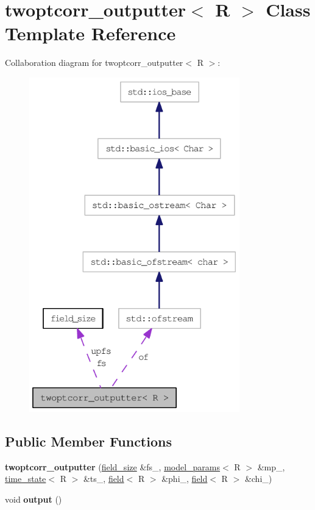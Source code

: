\hypertarget{classtwoptcorr__outputter}{
\section{twoptcorr\_\-outputter$<$ R $>$ Class Template Reference}
\label{classtwoptcorr__outputter}
}
Collaboration diagram for twoptcorr\_\-outputter$<$ R $>$:\nopagebreak
\begin{figure}[H]
\begin{center}
\leavevmode
\includegraphics[width=259pt]{classtwoptcorr__outputter__coll__graph}
\end{center}
\end{figure}
\subsection*{Public Member Functions}
\begin{DoxyCompactItemize}
\item 
\hypertarget{classtwoptcorr__outputter_aa12c83b128baced2f5bbd21e5399de5d}{
{\bfseries twoptcorr\_\-outputter} (\hyperlink{structfield__size}{field\_\-size} \&fs\_\-, \hyperlink{structmodel__params}{model\_\-params}$<$ R $>$ \&mp\_\-, \hyperlink{structtime__state}{time\_\-state}$<$ R $>$ \&ts\_\-, \hyperlink{classfield}{field}$<$ R $>$ \&phi\_\-, \hyperlink{classfield}{field}$<$ R $>$ \&chi\_\-)}
\label{classtwoptcorr__outputter_aa12c83b128baced2f5bbd21e5399de5d}

\item 
\hypertarget{classtwoptcorr__outputter_acd3fabba4d534ed9f028603562bc533f}{
void {\bfseries output} ()}
\label{classtwoptcorr__outputter_acd3fabba4d534ed9f028603562bc533f}

\end{DoxyCompactItemize}
